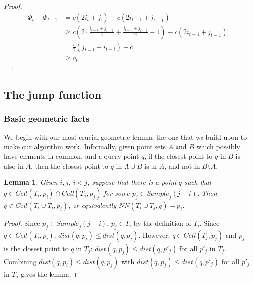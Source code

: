 \documentclass[12pt,a4paper,USenglish,cleveref, autoref, thm-restate]{article}
\newcommand{\Cell}{\mathit{Cell}}
\newcommand{\Sample}{\mathit{Sample}}
\newcommand{\NN}{\mathit{NN}}
\newcommand{\john}[1]{\textcolor{red}{#1}}
\newcommand{\yakov}[1]{\textcolor{blue}{Yakov: #1}}
\newtheorem{lemma}{Lemma}
\newcommand{\Cell}{\mathit{Cell}}
\newcommand{\Sample}{\mathit{Sample}}
\newcommand{\NN}{\mathit{NN}}
\newcommand{\john}[1]{\textcolor{red}{#1}}
\newcommand{\yakov}[1]{\textcolor{blue}{Yakov: #1}}
\newcommand{\Cell}{\mathit{Cell}}
\newcommand{\Sample}{\mathit{Sample}}
\newcommand{\NN}{\mathit{NN}}
\newcommand{\john}[1]{\textcolor{red}{#1}}
\newcommand{\yakov}[1]{\textcolor{blue}{Yakov: #1}}
\begin{document}
\begin{proof}
 \begin{align*}
 \Phi_t-\Phi_{t-1}&=  c(2i_t+j_t) - c(2i_{t-1}+j_{t-1})\\
 &\geq  c(2\cdot\frac{i_{t-1}+j_{t-1}}{2}+\frac{i_{t-1}+j_{t-1}}{2}+1) - c(2i_{t-1}+j_{t-1})
\\
&= \frac{c}{2}(j_{t-1}-i_{t-i})+c
\\ &\geq a_t
\end{align*}
\end{proof}


\subsection{The jump function}
\label{sec:jump}

\subsubsection{Basic geometric facts}

We begin with our most crucial geometric lemma, the one that we build upon to make our algorithm work. Informally, given point sets $A$ and $B$ which possibly have elements in common, and a query point $q$, if the closest point to $q$ in $B$ is also in $A$, then the closest point to $q$ in $A \cup B$ is in $A$, and not in $B \setminus A$. 

\begin{lemma}
  \label{lemma:beats1}
  Given $i,j$, $i<j$, suppose that there is a point $q$ such that $q\in \Cell(T_i,p_i)\cap \Cell(T_j,p_j)$ for some $p_j \in \Sample_j(j-i)$. Then $q \in \Cell(T_i \cup T_j,p_i)$, or equivalently $\NN(T_i \cup T_j,q)=p_i$.\\
\end{lemma}

\begin{proof}
  Since $p_j\in \Sample_j(j-i)$, $p_j\in T_i$ by the definition of $T_i$. 
  Since $q\in \Cell(T_i,p_i)$, $dist(q,p_i)\leq dist(q,p_j)$. 
  However, $q\in \Cell(T_j,p_j)$ and $p_j$ is the closest point to $q$ in $T_j$: $dist(q,p_j) \leq dist(q,p'_j)$ for all $p'_j$ in $T_j$. 
    Combining $dist(q,p_i)\leq dist(q,p_j)$ with $dist(q,p_j) \leq dist(q,p'_j)$ for all $p'_j$ in $T_j$ gives the lemma. 
\end{proof}
\end{document}
